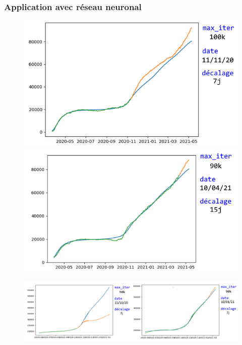 \documentclass{beamer}[aspectratio = 43]
\begin{document}
\begin{frame}
	\frametitle{Application avec réseau neuronal}
	\begin{figure}[h]
		\centering
		\begin{minipage}{0.5\textwidth}
			\includegraphics[scale=0.42]{NN_1_}
			\centering
		\end{minipage}%
		\begin{minipage}{0.5\textwidth}
			\includegraphics[scale=0.42]{NN_2_}
			\centering
		\end{minipage}
	\end{figure}
	\begin{figure}
		\includegraphics[scale=0.4]{NN_3_}
	\end{figure}
\end{frame}
\end{document}
